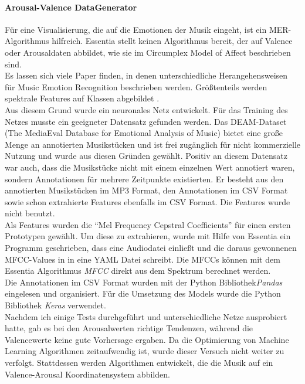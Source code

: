 \documentclass[11pt,a4paper]{article}
\begin{document}
\paragraph{Arousal-Valence DataGenerator}
Für eine Visualisierung, die auf die Emotionen der Musik eingeht, ist ein MER-Algorithmus hilfreich. Essentia stellt keinen Algorithmus bereit, der auf Valence oder Arousaldaten abbildet, wie sie im Circumplex Model of Affect beschrieben sind.\\
Es lassen sich viele Paper finden, in denen unterschiedliche Herangehensweisen für Music Emotion Recognition beschrieben werden. Größtenteils werden spektrale Features auf Klassen abgebildet \cite[S. 159]{lerch2012introduction}.\\
Aus diesem Grund wurde ein neuronales Netz entwickelt. Für das Training des Netzes musste ein geeigneter Datensatz gefunden werden. Das DEAM-Dataset (The MediaEval Database for Emotional Analysis of Music) bietet eine große Menge an annotierten Musikstücken und ist frei zugänglich für nicht kommerzielle Nutzung \cite{AlajankiEmoInMusicAnalysis} und wurde aus diesen Gründen gewählt. Positiv an diesem Datensatz war auch, dass die Musikstücke nicht mit einem einzelnen Wert annotiert waren, sondern Annotationen für mehrere Zeitpunkte existierten. Er besteht aus den annotierten Musikstücken im MP3 Format, den Annotationen im CSV Format sowie schon extrahierte Features ebenfalls im CSV Format. Die Features wurde nicht benutzt.\\
Als Features wurden die ``Mel Frequency Cepstral Coefficients'' für einen ersten Prototypen gewählt. Um diese zu extrahieren, wurde mit Hilfe von Essentia ein Programm geschrieben, dass eine Audiodatei einließt und die daraus gewonnenen MFCC-Values in in eine YAML Datei schreibt. Die MFCCs können mit dem Essentia Algorithmus \textit{MFCC} direkt aus dem Spektrum berechnet werden.\\
Die Annotationen im CSV Format wurden mit der Python Bibliothek\textit{Pandas}\cite{pandasDoc} eingelesen und organisiert. Für die Umsetzung des Models wurde die Python Bibliothek \textit{Keras}\cite{kerasDoc} verwendet.\\
Nachdem ich einige Tests durchgeführt und unterschiedliche Netze ausprobiert hatte, gab es bei den Arousalwerten richtige Tendenzen, während die Valencewerte keine gute Vorhersage ergaben. Da die Optimierung von Machine Learning Algorithmen zeitaufwendig ist, wurde dieser Versuch nicht weiter zu verfolgt. Stattdessen werden Algorithmen entwickelt, die die Musik auf ein Valence-Arousal Koordinatensystem abbilden.
\end{document}

